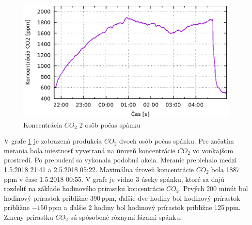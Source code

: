 \begin{figure}[H]
	\centering
	\includegraphics[width=350pt]{images/2ludiaNocCO2.eps} 
	\caption{Koncentrácia $CO_2$ 2 osôb počas spánku}
	\label{img2osobyNoc}
\end{figure}
V grafe \ref{img2osobyNoc} je zobrazená produkcia $CO_2$ dvoch osôb počas spánku. Pre začatím merania bola miestnosť vyvetraná na úroveň koncentrácie $CO_2$ vo vonkajšom prostredí. Po prebudení sa vykonala podobná akcia. Meranie prebiehalo medzi 1.5.2018 21:41 a 2.5.2018 05:22. Maximálna úroveň koncentrácie $CO_2$ bola 1887\,ppm v čase 1.5.2018 00:55. V grafe je vidno 3 úseky spánku, ktoré sa dajú rozdeliť na základe hodinového prírastku koncentrácie $CO_2$. Prvých 200 minút bol hodinový prírastok približne 390\,ppm, ďalšie dve hodiny bol hodinový prírastok približne $-150$\,ppm a ďalšie 2 hodiny bol hodinový prírastok približne 125\,ppm. Zmeny prírastku $CO_2$ sú spôsobené rôznymi fázami spánku.


